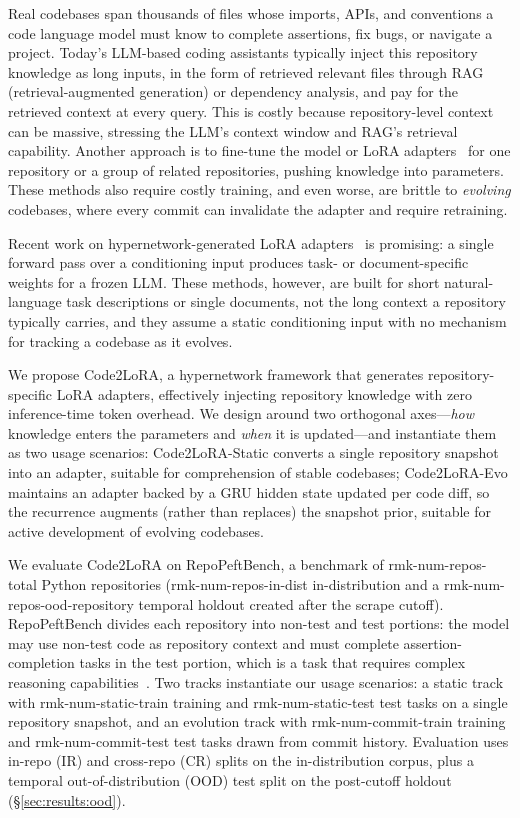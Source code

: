 \documentclass[11pt]{article}
\newcommand{\UseMacro}[1]{\csname rmk-#1\endcsname}
\newcommand{\codelora}{Code2LoRA\xspace}
\newcommand{\repopeftbench}{RepoPeftBench\xspace}
\newcommand{\codelorastatic}{\codelora-Static\xspace}
\newcommand{\codeloraevo}{\codelora-Evo\xspace}
\begin{document}
Real codebases span thousands of files whose imports, APIs, and conventions a code language model must know to complete assertions, fix bugs, or navigate a project.
Today's LLM-based coding assistants typically inject this repository knowledge as long inputs, in the form of retrieved relevant files through RAG (retrieval-augmented generation) or dependency analysis, and pay for the retrieved context at every query.
This is costly because repository-level context can be massive, stressing the LLM's context window and RAG's retrieval capability.
Another approach is to fine-tune the model or LoRA adapters~\cite{hu2022lora} for one repository or a group of related repositories, pushing knowledge into parameters.
These methods also require costly training, and even worse, are brittle to \emph{evolving} codebases, where every commit can invalidate the adapter and require retraining.

Recent work on hypernetwork-generated LoRA adapters~\cite{ha2017hypernetworks,charakorn2025text2lora,charakorn2026doctolora} is promising: a single forward pass over a conditioning input produces task- or document-specific weights for a frozen LLM.
These methods, however, are built for short natural-language task descriptions or single documents, not the long context a repository typically carries, and they assume a static conditioning input with no mechanism for tracking a codebase as it evolves.

We propose \codelora{}, a hypernetwork framework that generates repository-specific LoRA adapters, effectively injecting repository knowledge with zero inference-time token overhead.
We design around two orthogonal axes---\emph{how} knowledge enters the parameters and \emph{when} it is updated---and instantiate them as two usage scenarios:
\codelorastatic{} converts a single repository snapshot into an adapter, suitable for comprehension of stable codebases;
\codeloraevo{} maintains an adapter backed by a GRU hidden state updated per code diff, so the recurrence augments (rather than replaces) the snapshot prior, suitable for active development of evolving codebases.

We evaluate \codelora{} on \repopeftbench{}, a benchmark of \UseMacro{num-repos-total} Python repositories (\UseMacro{num-repos-in-dist} in-distribution and a \UseMacro{num-repos-ood}-repository temporal holdout created after the scrape cutoff).
\repopeftbench{} divides each repository into non-test and test portions: the model may use non-test code as repository context and must complete assertion-completion tasks in the test portion, which is a task that requires complex reasoning capabilities~\cite{jain2025livecodebench}.
Two tracks instantiate our usage scenarios: a static track with \UseMacro{num-static-train} training and \UseMacro{num-static-test} test tasks on a single repository snapshot, and an evolution track with \UseMacro{num-commit-train} training and \UseMacro{num-commit-test} test tasks drawn from commit history.
Evaluation uses in-repo (IR) and cross-repo (CR) splits on the in-distribution corpus, plus a temporal out-of-distribution (OOD) test split on the post-cutoff holdout (\S\ref{sec:results:ood}).
\end{document}
